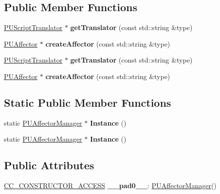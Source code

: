 \subsection*{Public Member Functions}
\begin{DoxyCompactItemize}
\item 
\mbox{\label{classPUAffectorManager_a92a52a6073e54fe447a99edfbbef2cf0}} 
\hyperlink{classPUScriptTranslator}{P\+U\+Script\+Translator} $\ast$ {\bfseries get\+Translator} (const std\+::string \&type)
\item 
\mbox{\label{classPUAffectorManager_a32c386d87bd4c47628c1cb9c51f6e276}} 
\hyperlink{classPUAffector}{P\+U\+Affector} $\ast$ {\bfseries create\+Affector} (const std\+::string \&type)
\item 
\mbox{\label{classPUAffectorManager_a405381ada756f9c9b527e95b6b96664b}} 
\hyperlink{classPUScriptTranslator}{P\+U\+Script\+Translator} $\ast$ {\bfseries get\+Translator} (const std\+::string \&type)
\item 
\mbox{\label{classPUAffectorManager_a1ffd108ad3bc4754eb2b7344397df963}} 
\hyperlink{classPUAffector}{P\+U\+Affector} $\ast$ {\bfseries create\+Affector} (const std\+::string \&type)
\end{DoxyCompactItemize}
\subsection*{Static Public Member Functions}
\begin{DoxyCompactItemize}
\item 
\mbox{\label{classPUAffectorManager_a2dfda5a9bad9ea5be9d4676bb4da88ed}} 
static \hyperlink{classPUAffectorManager}{P\+U\+Affector\+Manager} $\ast$ {\bfseries Instance} ()
\item 
\mbox{\label{classPUAffectorManager_a70b9ed498c4518b7fc55b9b67408bd82}} 
static \hyperlink{classPUAffectorManager}{P\+U\+Affector\+Manager} $\ast$ {\bfseries Instance} ()
\end{DoxyCompactItemize}
\subsection*{Public Attributes}
\begin{DoxyCompactItemize}
\item 
\mbox{\label{classPUAffectorManager_aaf54e357b62ed7cbbf5d11302f0e78ef}} 
\hyperlink{_2cocos2d_2cocos_2base_2ccConfig_8h_a25ef1314f97c35a2ed3d029b0ead6da0}{C\+C\+\_\+\+C\+O\+N\+S\+T\+R\+U\+C\+T\+O\+R\+\_\+\+A\+C\+C\+E\+SS} {\bfseries \+\_\+\+\_\+pad0\+\_\+\+\_\+}\+: \hyperlink{classPUAffectorManager}{P\+U\+Affector\+Manager}()
\end{DoxyCompactItemize}
